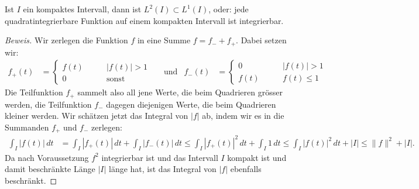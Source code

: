 %

\begin{satz}
\label{satz:l2inl1}
Ist $I$ ein kompaktes Intervall, dann ist $L^2(I)\subset L^1(I)$, oder:
jede quadratintegrierbare Funktion auf einem kompakten Intervall ist 
integrierbar.
\end{satz}

\begin{proof}[Beweis]
Wir zerlegen die Funktion $f$ in eine Summe $f=f_-+f_+$. 
Dabei setzen wir:
\begin{align*}
f_+(t) &= 
\begin{cases}
f(t)&\qquad |f(t)| > 1\\
0   &\qquad\text{sonst}
\end{cases}
&&\text{und}
&
f_-(t)
&=
\begin{cases}
0   &\qquad |f(t)| > 1\\
f(t)&\qquad f(t)\le 1
\end{cases}
\end{align*}
Die Teilfunktion $f_+$ sammelt also all jene Werte, die beim Quadrieren
grösser werden, die Teilfunktion $f_-$ dagegen diejenigen Werte, die
beim Quadrieren kleiner werden.
Wir schätzen jetzt das Integral von $|f|$ ab, indem wir es in die Summanden
$f_+$ und $f_-$ zerlegen:
\begin{align*}
\int_I |f(t)|\,dt
&=
\int_I |f_+(t)|\,dt + \int_I |f_-(t)|\,dt
\le
\int_I |f_+(t)|^2\,dt + \int_I 1\,dt
\le 
\int_I |f(t)|^2\,dt + |I|
\le \|f\|^2 + |I|.
\end{align*}
Da nach Voraussetzung $f^2$ integrierbar ist und das Intervall $I$ kompakt ist
und damit beschränkte Länge $|I|$ länge hat, ist das Integral von $|f|$
ebenfalls beschränkt.
\end{proof}

